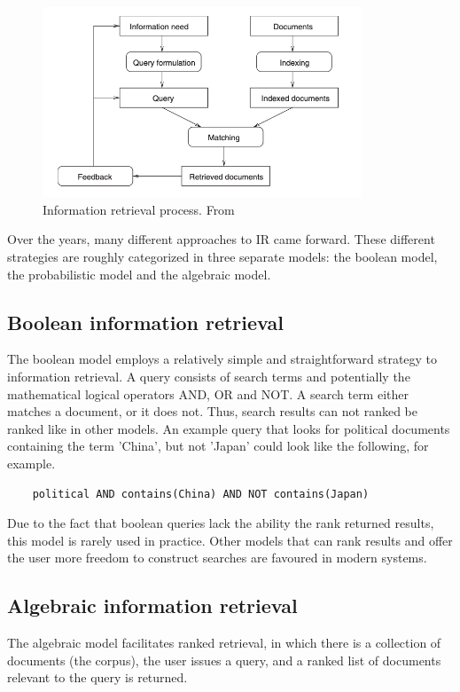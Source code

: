 \documentclass[twoside]{uva-inf-bachelor-thesis}
\begin{document}
\begin{figure}[h]
    \centering
    \includegraphics[width=0.85\textwidth]{images/irDiagram.png}
    \caption{Information retrieval process. From \cite{goker2009information}}
    \label{fig:ir}
\end{figure}

Over the years, many different approaches to IR came forward. These different strategies are roughly categorized in three separate models: the boolean model, the probabilistic model and the algebraic model. \cite{goker2009information}

\subsection{Boolean information retrieval}
The boolean model employs a relatively simple and straightforward strategy to information retrieval. A query consists of search terms and potentially the mathematical logical operators AND, OR and NOT. A search term either matches a document, or it does not. Thus, search results can not ranked be ranked like in other models.\cite{goker2009information, manning08IR} An example query that looks for political documents containing the term 'China', but not 'Japan' could look like the following, for example.
\begin{verbatim}
    political AND contains(China) AND NOT contains(Japan)
\end{verbatim}
Due to the fact that boolean queries lack the ability the rank returned results, this model is rarely used in practice. Other models that can rank results and offer the user more freedom to construct searches are favoured in modern systems.

\subsection{Algebraic information retrieval}
The algebraic model facilitates ranked retrieval, in which there is a collection of documents (the corpus), the user issues a query, and a ranked list of documents relevant to the query is returned.
\end{document}
